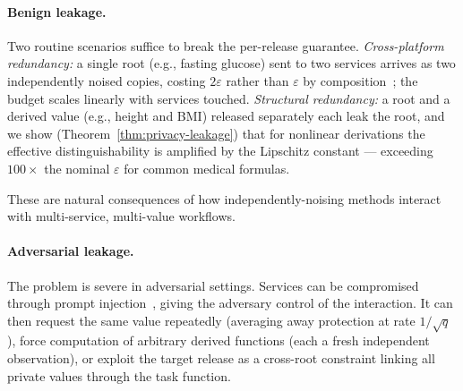 \paragraph{Benign leakage.} Two routine scenarios suffice to break the per-release guarantee. \emph{Cross-platform redundancy:} a single root (e.g., fasting glucose) sent to two services arrives as two independently noised copies, costing $2\varepsilon$ rather than $\varepsilon$ by composition~\cite{dwork2006calibrating}; the budget scales linearly with services touched. \emph{Structural redundancy:} a root and a derived value (e.g., height and BMI) released separately each leak the root, and we show (Theorem~\ref{thm:privacy-leakage}) that for nonlinear derivations the effective distinguishability is amplified by the Lipschitz constant --- exceeding $100\times$ the nominal $\varepsilon$ for common medical formulas.

\noindent These are natural consequences of how independently-noising methods interact with multi-service, multi-value workflows. 

\paragraph{Adversarial leakage.} The problem is severe in adversarial settings. Services can be compromised through prompt injection~\cite{greshake2023indirect,zhan2024injecagent,debenedetti2024agentdojo}, giving the adversary control of the interaction. It can then request the same value repeatedly (averaging away protection at rate $1/\sqrt{q}$), force computation of arbitrary derived functions (each a fresh independent observation), or exploit the target release as a cross-root constraint linking all private values through the task function.


 

